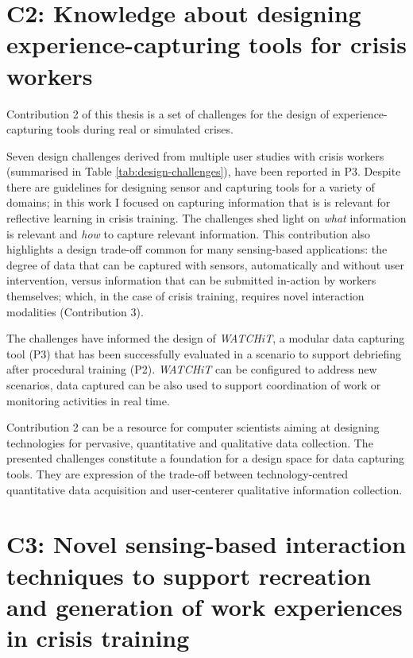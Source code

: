 \section{C2: Knowledge about designing experience-capturing tools for crisis workers}\label{c2-knowledge-about-designing-experience-capturing-tools-for-crisis-workers}

Contribution 2 of this thesis is a set of challenges for the design of experience-capturing tools during real or simulated crises.

Seven design challenges derived from multiple user studies with crisis workers (summarised in Table \ref{tab:design-challenges}), have been reported in P3. Despite there are guidelines for designing sensor and capturing tools for a variety of domains; in this work I focused on capturing information that is is relevant for reflective learning in crisis training. The challenges shed light on \emph{what} information is relevant and \emph{how} to capture relevant information. This contribution also highlights a design trade-off common for many sensing-based applications: the degree of data that can be captured with sensors, automatically and without user intervention, versus information that can be submitted in-action by workers themselves; which, in the case of crisis training, requires novel interaction modalities (Contribution 3). 

The challenges have informed the design of \emph{WATCHiT}, a modular data capturing tool (P3) that has been successfully evaluated in a scenario to support debriefing after procedural training (P2). \emph{WATCHiT} can be configured to address new scenarios, data captured can be also used to support coordination of work or monitoring activities in real time.

Contribution 2 can be a resource for computer scientists aiming at designing technologies for pervasive, quantitative and qualitative data collection. The presented challenges constitute a foundation for a design space for data capturing tools. They are expression of the trade-off between technology-centred quantitative data acquisition and user-centerer qualitative information collection.

\section{C3: Novel sensing-based interaction techniques to support recreation and generation of work experiences in crisis training}\label{c3-novel-sensing-based-interaction-techniques-to-support-recreation-and-generation-of-work-experiences-in-crisis-training}


